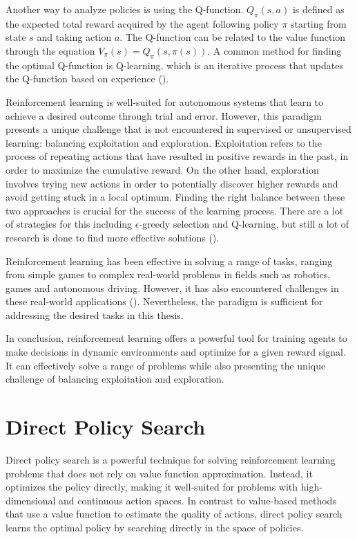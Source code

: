 Another way to analyze policies is using the Q-function. $Q_{\pi}(s, a)$ is defined as the expected total reward acquired by the agent following policy $\pi$ starting from state $s$ and taking action $a$. The Q-function can be related to the value function through the equation $V_{\pi}(s) = Q_{\pi}(s, \pi(s))$. A common method for finding the optimal Q-function is Q-learning, which is an iterative process that updates the Q-function based on experience (\cite{watkins_q-learning_1992}). 


Reinforcement learning is well-suited for autonomous systems that learn to achieve a desired outcome through trial and error. However, this paradigm presents a unique challenge that is not encountered in supervised or unsupervised learning: balancing exploitation and exploration. Exploitation refers to the process of repeating actions that have resulted in positive rewards in the past, in order to maximize the cumulative reward. On the other hand, exploration involves trying new actions in order to potentially discover higher rewards and avoid getting stuck in a local optimum. Finding the right balance between these two approaches is crucial for the success of the learning process. There are a lot of strategies for this including $\epsilon$-greedy selection and Q-learning, but still a lot of research is done to find more effective solutions (\cite{coggan_exploration_nodate}).

Reinforcement learning has been effective in solving a range of tasks, ranging from simple games to complex real-world problems in fields such as robotics, games and autonomous driving. However, it has also encountered challenges in these real-world applications (\cite{zhu_ingredients_2020}). Nevertheless, the paradigm is sufficient for addressing the desired tasks in this thesis.

In conclusion, reinforcement learning offers a powerful tool for training agents to make decisions in dynamic environments and optimize for a given reward signal. It can effectively solve a range of problems while also presenting the unique challenge of balancing exploitation and exploration.

\section{Direct Policy Search}
Direct policy search is a powerful technique for solving reinforcement learning problems that does not rely on value function approximation. Instead, it optimizes the policy directly, making it well-suited for problems with high-dimensional and continuous action spaces. In contrast to value-based methods that use a value function to estimate the quality of actions, direct policy search learns the optimal policy by searching directly in the space of policies.

